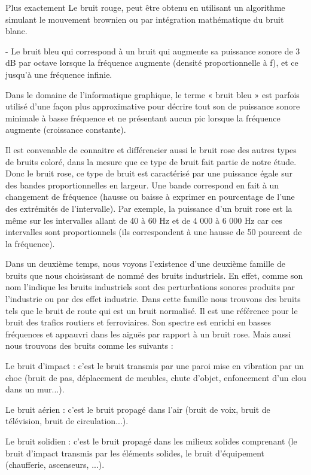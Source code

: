 \documentclass[conference,onecolumn]{IEEEtran}
\begin{document}
Plus exactement Le bruit rouge, peut être obtenu en utilisant un algorithme simulant le mouvement brownien ou par intégration mathématique du bruit blanc.  

- Le bruit bleu qui correspond à un bruit qui augmente sa puissance sonore de 3 dB par octave lorsque la fréquence augmente (densité proportionnelle à f), et ce jusqu’à une fréquence infinie. 

Dans le domaine de l’informatique graphique, le terme « bruit bleu » est parfois utilisé d’une façon plus approximative pour décrire tout son de puissance sonore minimale à basse fréquence et ne présentant aucun pic lorsque la fréquence augmente (croissance constante). 

Il est convenable de connaitre et différencier aussi le bruit rose des autres types de bruits coloré, dans la mesure que ce type de bruit fait partie de notre étude. Donc le bruit rose, ce type de bruit est caractérisé par une puissance égale sur des bandes proportionnelles en largeur. Une bande correspond en fait à un changement de fréquence (hausse ou baisse à exprimer en pourcentage de l’une des extrémités de l’intervalle). Par exemple, la puissance d’un bruit rose est la même sur les intervalles allant de 40 à 60 Hz et de 4 000 à 6 000 Hz car ces intervalles sont proportionnels (ils correspondent à une hausse de 50 pourcent de la fréquence). 

Dans un deuxième temps, nous voyons l’existence d’une deuxième famille de bruits que nous choisissant de nommé des bruits industriels. En effet, comme son nom l’indique les bruits industriels sont des perturbations sonores produits par l’industrie ou par des effet industrie. Dans cette famille nous trouvons des bruits tels que le bruit de route qui est un bruit normalisé. Il est une référence pour le bruit des trafics routiers et ferroviaires. Son spectre est enrichi en basses fréquences et appauvri dans les aiguës par rapport à un bruit rose. Mais aussi nous trouvons des bruits comme les suivants : 

Le bruit d’impact : c’est le bruit transmis par une paroi mise en vibration par un choc (bruit de pas, déplacement de meubles, chute d’objet, enfoncement d’un clou dans un mur...). 

 Le bruit aérien : c’est le bruit propagé dans l’air (bruit de voix, bruit de télévision, bruit de circulation...). 

Le bruit solidien : c’est le bruit propagé dans les milieux solides comprenant (le bruit d’impact transmis par les éléments solides, le bruit d’équipement (chaufferie, ascenseurs, ...). 
\end{document}
